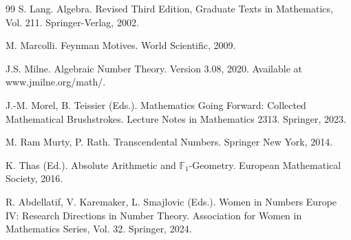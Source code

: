 \documentclass[11pt, a4paper]{article}
\theoremstyle{plain}
\theoremstyle{definition}
\numberwithin{equation}{section}
\newcommand{\FOne}{\mathbb{F}_1}
\begin{document}
\begin{thebibliography}{99}
 S. Lang. Algebra. Revised Third Edition, Graduate Texts in Mathematics, Vol. 211. Springer-Verlag, 2002.

 M. Marcolli. Feynman Motives. World Scientific, 2009.

 J.S. Milne. Algebraic Number Theory. Version 3.08, 2020. Available at www.jmilne.org/math/.

 J.-M. Morel, B. Teissier (Eds.). Mathematics Going Forward: Collected Mathematical Brushstrokes. Lecture Notes in Mathematics 2313. Springer, 2023.

 M. Ram Murty, P. Rath. Transcendental Numbers. Springer New York, 2014.

 K. Thas (Ed.). Absolute Arithmetic and $\FOne$-Geometry. European Mathematical Society, 2016.

 R. Abdellatif, V. Karemaker, L. Smajlovic (Eds.). Women in Numbers Europe IV: Research Directions in Number Theory. Association for Women in Mathematics Series, Vol. 32. Springer, 2024.

\end{thebibliography}
\end{document}

